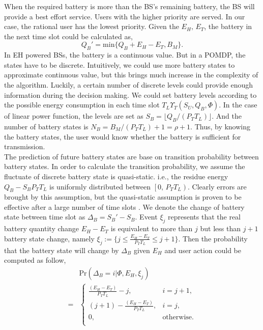 \documentclass[conference]{IEEEtran}
\begin{document}
When the required battery is more than the BS's remaining battery,
the BS will provide a best effort service.
Users with the higher priority are served.
In our case, the rational user has the lowest priority.
Given the \(E_H,\,E_T\), the battery in the next time slot could be calculated as,
\begin{equation}
	Q_B' = \mbox{min}\{Q_B + E_H - E_T, B_M\}.
\end{equation}
\indent In EH powered BSs, the battery is a continuous value.
But in a POMDP, the states have to be discrete.
Intuitively, we could use more battery states to approximate continuous value,
but this brings much increase in the complexity of the algorithm.
Luckily, a certain number of discrete levels could provide enough information during the decision making.
We could set battery levels according to the possible energy consumption in each time slot \(T_L\Upsilon_T(S_U,Q_B,\Phi)\).
In the case of linear power function, the levels are set as \(S_B = \lfloor Q_B / \left(P_TT_L\right) \rfloor\).
And the number of battery states is \(N_B = B_M / \left(P_TT_L\right) +1 = \rho + 1\).
Thus, by knowing the battery states,
the user would know whether the battery is sufficient for transmission.\\
\indent
The prediction of future battery states are base on transition probability between battery states.
In order to calculate the transition probability,
we assume the fluctuate of discrete battery state is quasi-static.
i.e., the residue energy \(Q_B - S_BP_TT_L\) is uniformly distributed between \(\left[0,\,P_TT_L\right)\).
Clearly errors are brought by this assumption,
but the quasi-static assumption is proven to be effective after a large number of time slots \cite{data}.
We denote the change of battery state between time slot as \(\Delta_B = S_{B}' - S_B\).
Event \(\xi_j\) represents that the real battery quantity change \(E_H - E_T\)
is equivalent to more than \(j\) but less than \(j+1\) battery state change, namely
\(\xi_j := \{j\leq \frac{E_H - E_T}{P_TT_L} \le j+1\}\).
Then the probability that the battery state will change by \(\Delta_B\)
given \(E_H\) and user action could be computed as follow,
\begin{align}&\mbox{Pr}\left(\Delta_B = i |\Phi, E_H, \xi_j \right)\nonumber\\
=&\begin{cases} \frac{\left(E_H - E_T\right)}{P_TT_L} -j, &\mbox{$i = j + 1$},\\
\left(j+1\right) -\frac{\left(E_H - E_T\right)} {P_TT_L}, &\mbox{$i = j$},\\
0, &\mbox{otherwise.}\\
\end{cases}
\end{align}
\end{document}
